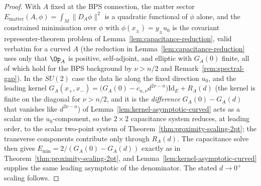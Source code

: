 \begin{proof}
With $A$ fixed at the BPS connection, the matter sector
$E_{\mathrm{matter}}(A,\phi)=\int_M\|D_A\phi\|^2$ is a quadratic
functional of $\phi$ alone, and the constrained minimisation over
$\phi$ with $\phi(x_\pm)=y_\pm u_0$ is the covariant
representer-theorem problem of
Lemma~\ref{lem:capacitance-reduction}, valid verbatim for a curved $A$ (the
reduction in Lemma~\ref{lem:capacitance-reduction} uses only that $\Op_A$ is
positive, self-adjoint, and elliptic with $G_A(0)$ finite, all of
which hold for the BPS background by $\nu>n/2$ and
Remark~\ref{rem:spectral-gap}). In the $SU(2)$ case the data lie along
the fixed direction $u_0$, and the leading kernel
$G_A(x_+,x_-)=\bigl(G_A(0)-c_{n,\nu}d^{2\nu-n}\bigr)\mathrm{Id}_E+R_A(d)$
(the kernel is finite on the diagonal for $\nu>n/2$, and it is the
\emph{difference} $G_A(0)-G_A(d)$ that vanishes like $d^{2\nu-n}$) of
Lemma~\ref{lem:kernel-asymptotic-curved} acts as a scalar on the
$u_0$-component, so the $2\times 2$ capacitance system reduces, at
leading order, to the scalar two-point system of
Theorem~\ref{thm:proximity-scaling-2pt}; the transverse components
contribute only through $R_A(d)$. The capacitance solve then gives
$E_{\min}=2/(G_A(0)-G_A(d))$ exactly as in
Theorem~\ref{thm:proximity-scaling-2pt}, and
Lemma~\ref{lem:kernel-asymptotic-curved} supplies the same leading
asymptotic of the denominator. The stated $d\to 0^+$ scaling follows.
\end{proof}

